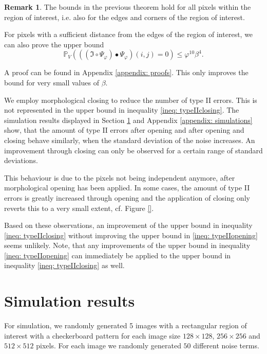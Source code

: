 \documentclass[a4paper,12pt]{article}
\theoremstyle{plain}
\theoremstyle{definition}
\newtheorem{remark}[theorem]{Remark}
\begin{document}
\begin{remark}
	The bounds in the previous theorem hold for all pixels within the region of interest, i.e. also for the edges and corners of the region of interest.
	
	For pixels with a sufficient distance from the edges of the region of interest, we can also prove the upper bound
	\begin{equation*}
		\mathbb{P}_V\left( ((\mathfrak{I} \circ \Psi_\varphi) \bullet \Psi_\varphi)(i, j) = 0 \right) \leq \varphi^{10} \beta^4.
	\end{equation*}
	
	A proof can be found in Appendix \ref{appendix: proofs}. This only improves the bound for very small values of $\beta$.
\end{remark}

We employ morphological closing to reduce the number of type II errors. This is not represented in the upper bound in inequality \eqref{ineq: typeIIclosing}. The simulation results displayed in Section \ref{section: simulationresults} and Appendix \ref{appendix: simulations} show, that the amount of type II errors after opening and after opening and closing behave similarly, when the standard deviation of the noise increases. An improvement through closing can only be observed for a certain range of standard deviations.

This behaviour is due to the pixels not being independent anymore, after morphological opening has been applied. In some cases, the amount of type II errors is greatly increased through opening and the application of closing only reverts this to a very small extent, cf. Figure \ref{}.

Based on these observations, an improvement of the upper bound in inequality \eqref{ineq: typeIIclosing} without improving the upper bound in \eqref{ineq: typeIIopening} seems unlikely.
Note, that any improvements of the upper bound in inequality \eqref{ineq: typeIIopening} can immediately be applied to the upper bound in inequality \eqref{ineq: typeIIclosing} as well.

\newpage



\section{Simulation results}\label{section: simulationresults}

For simulation, we randomly generated 5 images with a rectangular region of interest with a checkerboard pattern for each image size $128 \times 128$, $256 \times 256$ and $512 \times 512$ pixels. For each image we randomly generated $50$ different noise terms.
\end{document}
